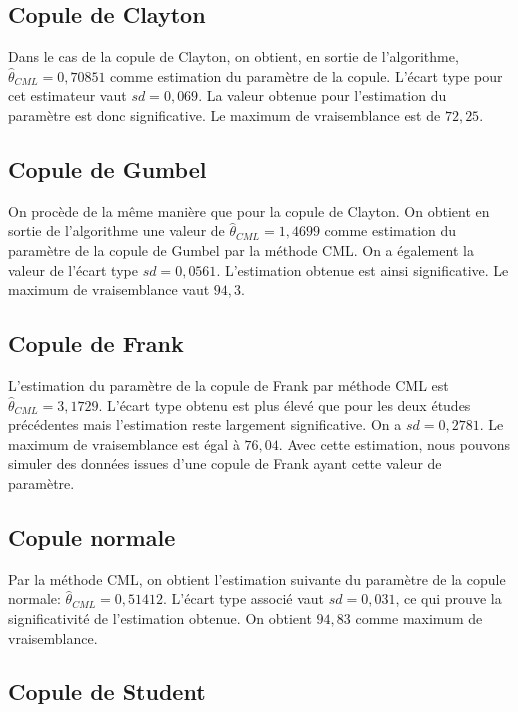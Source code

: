\subsection{Copule de Clayton}

Dans le cas de la copule de Clayton, on obtient, en sortie de l'algorithme, $\widehat{\theta}_{CML}=0,70851$ comme estimation du paramètre de la copule. L'écart type pour cet estimateur vaut $sd = 0,069$. La valeur obtenue pour l'estimation du paramètre est donc significative. Le maximum de vraisemblance est de $72,25$. 

\subsection{Copule de Gumbel}

On procède de la même manière que pour la copule de Clayton. On obtient en sortie de l'algorithme une valeur de $\widehat{\theta}_{CML}=1,4699$ comme estimation du paramètre de la copule de Gumbel par la méthode CML. On a également la valeur de l'écart type $sd = 0,0561$. L'estimation obtenue est ainsi significative. Le maximum de vraisemblance vaut $94,3$.

\subsection{Copule de Frank}

L'estimation du paramètre de la copule de Frank par méthode CML est $\widehat{\theta}_{CML}=3,1729$. L'écart type obtenu est plus élevé que pour les deux études précédentes mais l'estimation reste largement significative. On a $sd = 0,2781$. Le maximum de vraisemblance est égal à $76,04$. Avec cette estimation, nous pouvons simuler des données issues d'une copule de Frank ayant cette valeur de paramètre. 

\subsection{Copule normale}

Par la méthode CML, on obtient l'estimation suivante du paramètre de la copule normale: $\widehat{\theta}_{CML}=0,51412$. L'écart type associé vaut $sd = 0,031$, ce qui prouve la significativité de l'estimation obtenue. On obtient $94,83$ comme maximum de vraisemblance. 

\subsection{Copule de Student}

